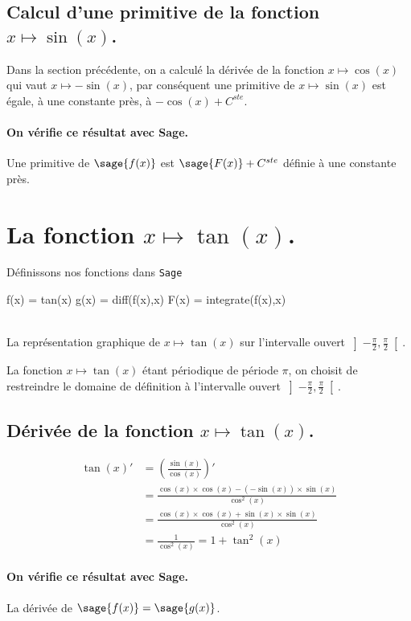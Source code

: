 \documentclass[a4paper,landscape,17pt]{extreport} %
\begin{document}
\subsection{Calcul d'une primitive de la fonction  $x \mapsto \sin(x)$.}
Dans la section précédente, on a calculé la dérivée de la fonction $x \mapsto \cos(x)$ qui vaut $x \mapsto -\sin(x)$, par conséquent une primitive de $x \mapsto \sin(x)$ est égale, à une constante près, à $ - \cos(x) + C^{ste} $.
\paragraph{On vérifie ce résultat avec Sage.}
Une primitive de $\sage{f(x)}$ est $ \sage{F(x)} + C^{ste} $ définie à une constante près.


\section{La fonction  $x \mapsto \tan(x)$.}
Définissons nos fonctions dans {\texttt{Sage}}
\begin{sageblock}
    f(x) = tan(x)
    g(x) = diff(f(x),x)
    F(x) = integrate(f(x),x)
\end{sageblock}

\begin{center}
 \\
La représentation graphique de $x\mapsto \tan(x)$ sur l'intervalle ouvert $ \left] -\frac{\pi}{ 2} , \frac{\pi}{ 2} \right[ $.
\end{center}

La fonction $x \mapsto \tan(x)$ étant périodique de période $\pi$, on choisit de restreindre le domaine de définition à l'intervalle ouvert $ \left] -\frac{\pi}{ 2} , \frac{\pi}{ 2} \right[ $.

\subsection{Dérivée de la fonction $x \mapsto \tan(x)$.}
\begin{align*}
\tan(x)' 
& =  \left(\frac{\sin(x)}{\cos(x)}\right)' \\ 
& =  \frac{\cos(x) \times \cos(x) - (-\sin(x)) \times \sin(x)}{\cos^2(x)}  \\ 
& =  \frac{\cos(x) \times \cos(x) + \sin(x)\times \sin(x)}{\cos^2(x)}  \\ 
& =  \frac{1}{\cos^2(x)} = 1 + \tan^2(x)
\end{align*}
\paragraph{On vérifie ce résultat avec Sage.}
La dérivée de $\sage{f(x)} = \sage{g(x)} $.
\end{document}
